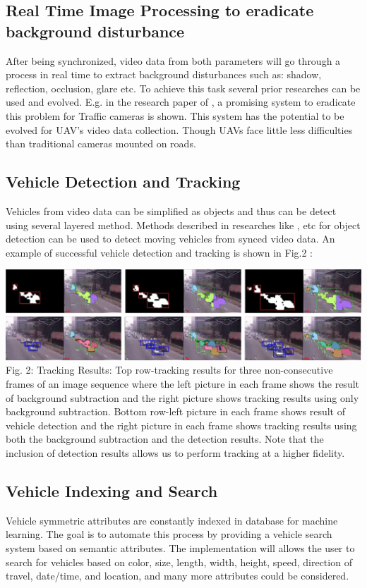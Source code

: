 \documentclass[12pt,a4paper,oneside]{article}
\begin{document}
\subsection{Real Time Image Processing to eradicate background disturbance}

After being synchronized, video data from both parameters will go through a process in real time to extract background disturbances such as: shadow, reflection, occlusion, glare etc. To achieve this task several prior researches can be used and evolved. E.g. in the research paper of \cite{feris2012large}, a promising system to eradicate this problem for Traffic cameras is shown. This system has the potential to be evolved for UAV’s video data collection. Though UAVs face little less difficulties than traditional cameras mounted on roads. 

\newpage
\subsection{Vehicle Detection and Tracking}

Vehicles from video data can be simplified as objects and thus can be detect using several layered method. Methods described in researches like \cite{viola2001robust}, \cite{cucchiara2001improving} etc for object detection can be used to detect moving vehicles from synced video data. An example of successful vehicle detection and tracking is shown in Fig.2 :

\begin{center}
\includegraphics[width=0.8\linewidth]{Fig2.png}\\
Fig. 2: Tracking Results: Top row-tracking results for three non-consecutive frames of an image sequence where the left picture in each frame shows the result of background subtraction and the right picture shows tracking results using only background subtraction. Bottom row-left picture in each frame shows result of vehicle detection and the right picture in each frame shows tracking results using both the background subtraction and the detection results. Note that the inclusion of detection results allows us to perform tracking at a higher fidelity.
\end{center}

\subsection{Vehicle Indexing and Search}

Vehicle symmetric attributes are constantly indexed in database for machine learning. The goal is to automate this process by providing a vehicle search system based on semantic attributes. The implementation will allows the user to search for vehicles based on color, size, length, width, height, speed, direction of travel, date/time, and location, and many more attributes could be considered.  

\newpage

\end{document}
